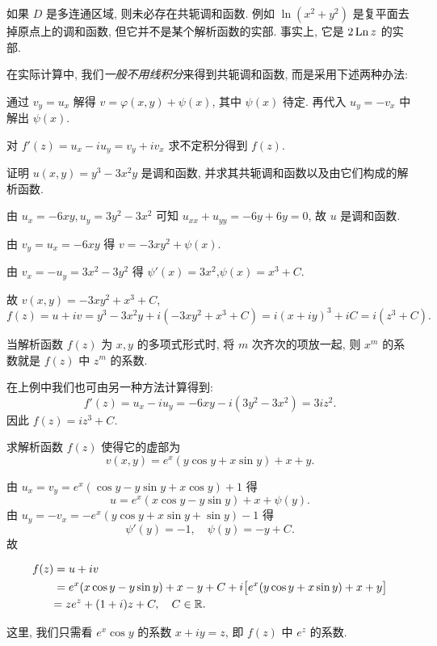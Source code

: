 \documentclass[nocolor,theme=doremi,lang=cn,11pt,chinese,twoside,openright,usesamecnt]{elegantbook}
\newenvironment{alertblock}[1]{\begin{tcolorbox}[alertstyle,title=#1]}{\end{tcolorbox}}
\begin{document}
如果 $D$ 是多连通区域, 则未必存在共轭调和函数.
例如 $\ln(x^2+y^2)$ 是复平面去掉原点上的调和函数, 但它并不是某个解析函数的实部.
事实上, 它是 $2\operatorname{Ln} z$ 的实部.

在实际计算中, 我们\emph{一般不用线积分}来得到共轭调和函数, 而是采用下述两种办法:
\begin{alertblock}{偏积分法}
	通过 $v_y=u_x$ 解得 $v=\varphi(x,y)+\psi(x)$, 其中 $\psi(x)$ 待定.
	{再代入 $u_y=-v_x$ 中解出 $\psi(x)$.}
\end{alertblock}
\begin{alertblock}{不定积分法}
	对 $f'(z)=u_x-iu_y=v_y+iv_x$ 求不定积分得到 $f(z)$.
\end{alertblock}

\begin{example}
	证明 $u(x,y)=y^3-3x^2y$ 是调和函数, 并求其共轭调和函数以及由它们构成的解析函数.
\end{example}

\begin{solution}
	由 $u_x=-6xy,u_y=3y^2-3x^2$ 可知 $u_{xx}+u_{yy}=-6y+6y=0$,
	{故 $u$ 是调和函数.}

	{由 $v_y=u_x=-6xy$ 得 $v=-3xy^2+\psi(x)$.}

	{由 $v_x=-u_y=3x^2-3y^2$ 得 $\psi'(x)=3x^2$,$\psi(x)=x^3+C$.}

	{故 $v(x,y)=-3xy^2+x^3+C$,
	\[
		f(z)=u+iv=y^3-3x^2y+i(-3xy^2+x^3+C)
		{=i(x+iy)^3+iC=i(z^3+C).}
	\]}
\end{solution}

当解析函数 $f(z)$ 为 $x,y$ 的多项式形式时, 将 $m$ 次齐次的项放一起, 则 $x^m$ 的系数就是 $f(z)$ 中 $z^m$ 的系数.

在上例中我们也可由另一种方法计算得到:
\[f'(z)=u_x-iu_y=-6xy-i(3y^2-3x^2)=3iz^2.\]
因此 $f(z)=iz^3+C$.

\begin{example}
	求解析函数 $f(z)$ 使得它的虚部为
	\[v(x,y)=e^x(y\cos y+x\sin y)+x+y.\]
\end{example}

\begin{solution}
	由 $u_x=v_y=e^x(\cos y-y\sin y+x\cos y)+1$ 得
	\[u=e^x(x\cos y-y\sin y)+x+\psi(y).\]
	{由 $u_y=-v_x=-e^x(y\cos y+x\sin y+\sin y)-1$ 得
	\[\psi'(y)=-1,\quad\psi(y)=-y+C.\]}
	故

	\begin{align*}
		f(z)&=u+iv\\
		&=e^x(x\cos y-y\sin y)+x-y+C
		+i\bigl[e^x(y\cos y+x\sin y)+x+y\bigr]\\
		&{=ze^z+(1+i)z+C,\quad C\in{\mathbb{R}}.}
	\end{align*}
\end{solution}
这里, 我们只需看 $e^x\cos y$ 的系数 $x+iy=z$, 即 $f(z)$ 中 $e^z$ 的系数.
\end{document}

